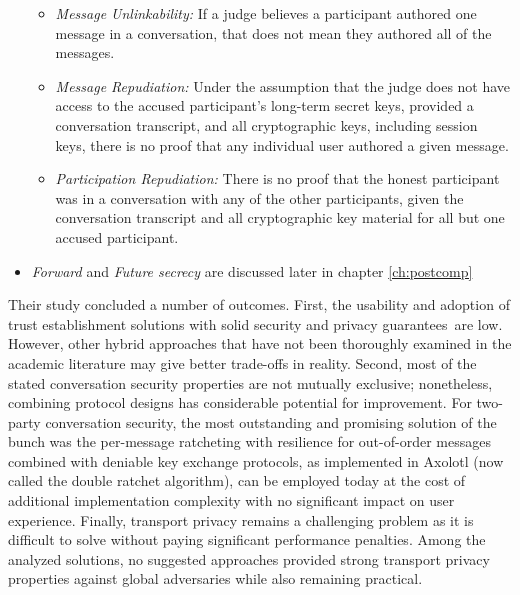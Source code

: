 \begin{itemize}
	\begin{itemize}
		\item \textit{Message Unlinkability:} If a judge believes a participant authored one message in a conversation, that does not mean they authored all of the messages.
		
		\item \textit{Message Repudiation:} Under the assumption that the judge does not have access to the accused participant's long-term secret keys, provided a conversation transcript, and all cryptographic keys, including session keys, there is no proof that any individual user authored a given message.
		
		\item \textit{Participation Repudiation:} There is no proof that the honest participant was in a conversation with any of the other participants, given the conversation transcript and all cryptographic key material for all but one accused participant.
		
	\end{itemize}
	\item \textit{Forward} and \textit{Future secrecy} are discussed later in chapter \ref{ch:postcomp}
\end{itemize}
Their study concluded a number of outcomes.
First, the usability and adoption of trust establishment solutions with solid security and privacy guarantees are low. However, other hybrid approaches that have not been thoroughly examined in the academic literature may give better trade-offs in reality.
Second, most of the stated conversation security properties are not mutually exclusive; nonetheless, combining protocol designs has considerable potential for improvement. For two-party conversation security, the most outstanding and promising solution of the bunch was the per-message ratcheting with resilience for out-of-order messages combined with deniable key exchange protocols, as implemented in Axolotl (now called the double ratchet algorithm), can be employed today at the cost of additional implementation complexity with no significant impact on user experience. 
Finally, transport privacy remains a challenging problem as it is difficult to solve without paying significant performance penalties. Among the analyzed solutions, no suggested approaches provided strong transport privacy properties against global adversaries while also remaining practical.

